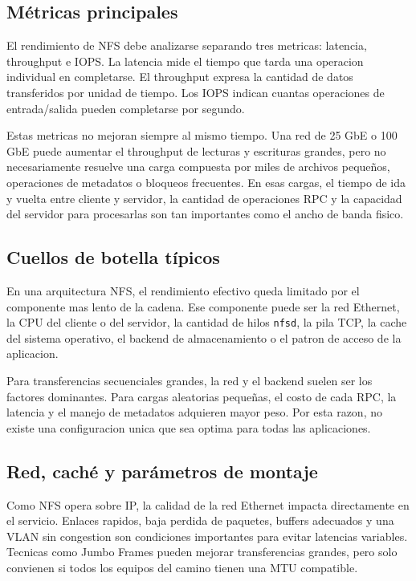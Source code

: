 \subsection{Métricas principales}

El rendimiento de NFS debe analizarse separando tres metricas: latencia, throughput e IOPS. La latencia mide el tiempo que tarda una operacion individual en completarse. El throughput expresa la cantidad de datos transferidos por unidad de tiempo. Los IOPS indican cuantas operaciones de entrada/salida pueden completarse por segundo.

Estas metricas no mejoran siempre al mismo tiempo. Una red de 25 GbE o 100 GbE puede aumentar el throughput de lecturas y escrituras grandes, pero no necesariamente resuelve una carga compuesta por miles de archivos pequeños, operaciones de metadatos o bloqueos frecuentes. En esas cargas, el tiempo de ida y vuelta entre cliente y servidor, la cantidad de operaciones RPC y la capacidad del servidor para procesarlas son tan importantes como el ancho de banda fisico.

\subsection{Cuellos de botella típicos}

En una arquitectura NFS, el rendimiento efectivo queda limitado por el componente mas lento de la cadena. Ese componente puede ser la red Ethernet, la CPU del cliente o del servidor, la cantidad de hilos \texttt{nfsd}, la pila TCP, la cache del sistema operativo, el backend de almacenamiento o el patron de acceso de la aplicacion.

Para transferencias secuenciales grandes, la red y el backend suelen ser los factores dominantes. Para cargas aleatorias pequeñas, el costo de cada RPC, la latencia y el manejo de metadatos adquieren mayor peso. Por esta razon, no existe una configuracion unica que sea optima para todas las aplicaciones.

\subsection{Red, caché y parámetros de montaje}

Como NFS opera sobre IP, la calidad de la red Ethernet impacta directamente en el servicio. Enlaces rapidos, baja perdida de paquetes, buffers adecuados y una VLAN sin congestion son condiciones importantes para evitar latencias variables. Tecnicas como Jumbo Frames pueden mejorar transferencias grandes, pero solo convienen si todos los equipos del camino tienen una MTU compatible.

